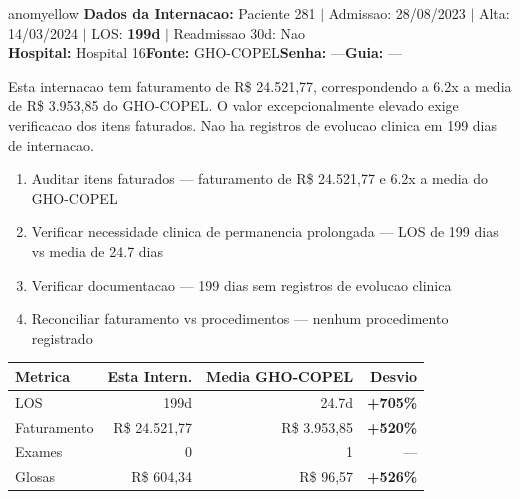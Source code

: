 \documentclass[a4paper,10pt]{article}
\begin{document}
\begin{anomalycard}[Internacao 204 | GHO-COPEL | MODERADO (z=2.11)]{anomyellow}
\textbf{Dados da Internacao:} Paciente 281 $\mid$ Admissao: 28/08/2023 $\mid$ Alta: 14/03/2024 $\mid$ LOS: \textbf{199d} $\mid$ Readmissao 30d: Nao\\
\textbf{Hospital:} Hospital 16\quad\textbf{Fonte:} GHO-COPEL\quad\textbf{Senha:} ---\quad\textbf{Guia:} ---\\
\vspace{2pt}\begin{tcolorbox}[colback=severityred!20,colframe=anomyellow,title={\textbf{Interpretacao de Negocio}},fonttitle=\bfseries\small,left=4pt,right=4pt,top=3pt,bottom=3pt]
{\small Esta internacao tem faturamento de R\$ 24.521,77, correspondendo a 6.2x a media de R\$ 3.953,85 do GHO-COPEL. O valor excepcionalmente elevado exige verificacao dos itens faturados. Nao ha registros de evolucao clinica em 199 dias de internacao.}
\end{tcolorbox}
\begin{tcolorbox}[colback=severityyellow!30,colframe=anomorange,title={\textbf{Recomendacoes Especificas}},fonttitle=\bfseries\small,left=4pt,right=4pt,top=3pt,bottom=3pt]
\begin{enumerate}[nosep,leftmargin=16pt]
\item {\small Auditar itens faturados --- faturamento de R\$ 24.521,77 e 6.2x a media do GHO-COPEL}
\item {\small Verificar necessidade clinica de permanencia prolongada --- LOS de 199 dias vs media de 24.7 dias}
\item {\small Verificar documentacao --- 199 dias sem registros de evolucao clinica}
\item {\small Reconciliar faturamento vs procedimentos --- nenhum procedimento registrado}
\end{enumerate}
\end{tcolorbox}
\begin{center}\begin{tabular}{l r r r}\toprule\textbf{Metrica} & \textbf{Esta Intern.} & \textbf{Media GHO-COPEL} & \textbf{Desvio} \\\midrule
LOS & 199d & 24.7d & \textcolor{anomred}{\textbf{+705\%}} \\
Faturamento & R\$ 24.521,77 & R\$ 3.953,85 & \textcolor{anomred}{\textbf{+520\%}} \\
Exames & 0 & 1 & --- \\
Glosas & R\$ 604,34 & R\$ 96,57 & \textcolor{anomred}{\textbf{+526\%}} \\
\bottomrule\end{tabular}\end{center}


\end{anomalycard}
\end{document}
